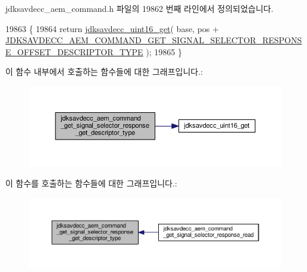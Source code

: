 jdksavdecc\+\_\+aem\+\_\+command.\+h 파일의 19862 번째 라인에서 정의되었습니다.


\begin{DoxyCode}
19863 \{
19864     \textcolor{keywordflow}{return} \hyperlink{group__endian_ga3fbbbc20be954aa61e039872965b0dc9}{jdksavdecc\_uint16\_get}( base, pos + 
      \hyperlink{group__command__get__signal__selector__response_ga40c716e630f9011ad02490f649bbc9cf}{JDKSAVDECC\_AEM\_COMMAND\_GET\_SIGNAL\_SELECTOR\_RESPONSE\_OFFSET\_DESCRIPTOR\_TYPE}
       );
19865 \}
\end{DoxyCode}


이 함수 내부에서 호출하는 함수들에 대한 그래프입니다.\+:
\nopagebreak
\begin{figure}[H]
\begin{center}
\leavevmode
\includegraphics[width=350pt]{group__command__get__signal__selector__response_ga7901e5fd86199424ef292086f7e7d44d_cgraph}
\end{center}
\end{figure}




이 함수를 호출하는 함수들에 대한 그래프입니다.\+:
\nopagebreak
\begin{figure}[H]
\begin{center}
\leavevmode
\includegraphics[width=350pt]{group__command__get__signal__selector__response_ga7901e5fd86199424ef292086f7e7d44d_icgraph}
\end{center}
\end{figure}


